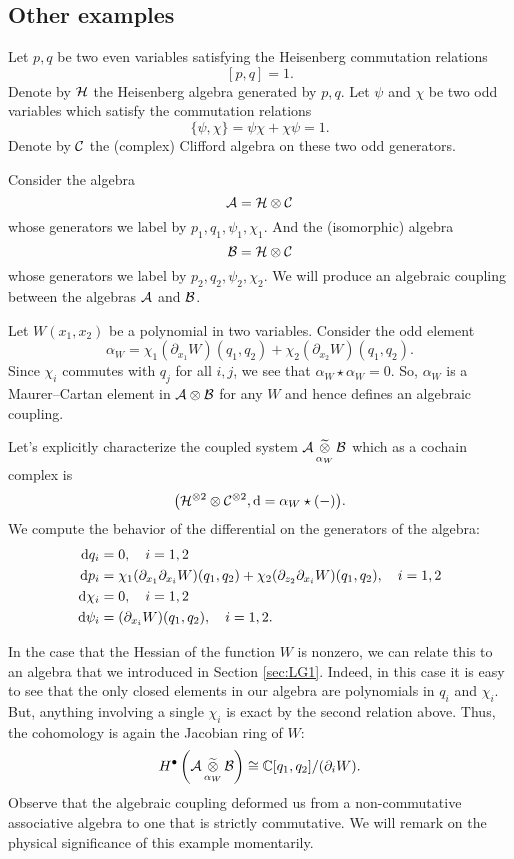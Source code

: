 \documentclass[11pt]{amsart}
\begin{document}
\subsection{Other examples}

Let $p,q$ be two even variables satisfying the Heisenberg commutation relations
\[
[p,q] = 1.
\]
Denote by $\mathcal H$ the Heisenberg algebra generated by $p,q$. 
Let $\psi$ and $\chi$ be two odd variables which satisfy the commutation relations
\[
\{\psi, \chi\} = \psi \chi + \chi \psi = 1.
\]
Denote by $\mathcal C$ the (complex) Clifford algebra on these two odd generators.

Consider the algebra 
\[
\mathcal A = \mathcal H\otimes \mathcal C 
\]
whose generators we label by $p_1,q_1,\psi_1,\chi_1$.
And the (isomorphic) algebra
\[
\mathcal B = \mathcal H \otimes \mathcal C
\]
whose generators we label by $p_2,q_2,\psi_2,\chi_2$.
We will produce an algebraic coupling between the algebras $\mathcal A$ and $\mathcal B$. 

Let $W(x_1,x_2)$ be a polynomial in two variables. 
Consider the odd element 
\[
\alpha_W = \chi_1 (\partial_{x_1} W)(q_1,q_2) + \chi_2 (\partial_{x_2} W)(q_1,q_2) .
\]
Since $\chi_i$ commutes with $q_j$ for all $i,j$, we see that $\alpha_W \star \alpha_W = 0$.
So, $\alpha_W$ is a Maurer--Cartan element in $\mathcal A \otimes \mathcal B$ for any $W$ and hence defines an algebraic coupling. 

Let's explicitly characterize the coupled system $\mathcal A \, \underset{\alpha_W}{\widetilde{\otimes}} \, \mathcal B$ which as a cochain complex is 
\[
\big(\mathcal H^{\otimes 2} \otimes \mathcal C^{\otimes 2} , {\rm d} = \alpha_W \star (-) \big) .
\]
We compute the behavior of the differential on the generators of the algebra: 
\begin{align*}
{\rm d} q_i & = 0 , \quad i=1,2 \\
{\rm d} p_i & = \chi_1 (\partial_{x_1} \partial_{x_i} W)(q_1,q_2) + \chi_2 (\partial_{z_2} \partial_{x_i} W)(q_1,q_2) , \quad i = 1,2 \\
{\rm d} \chi_i & = 0, \quad i=1,2 \\
{\rm d} \psi_i & = (\partial_{x_i} W)(q_1,q_2), \quad i=1,2 . 
\end{align*}

In the case that the Hessian of the function $W$ is nonzero, we can relate this to an algebra that we introduced in Section \ref{sec:LG1}. 
Indeed, in this case it is easy to see that the only closed elements in our algebra are polynomials in $q_i$ and $\chi_i$. 
But, anything involving a single $\chi_i$ is exact by the second relation above. 
Thus, the cohomology is again the Jacobian ring of $W$:
\[
H^\bullet \left(\mathcal A \, \underset{\alpha_W}{\widetilde{\otimes}} \, \mathcal B\right) \cong \mathbb C[q_1,q_2] / (\partial_i W)  .
\]
Observe that the algebraic coupling deformed us from a non-commutative associative algebra to one that is strictly commutative. 
We will remark on the physical significance of this example momentarily. 
%
\end{document}
